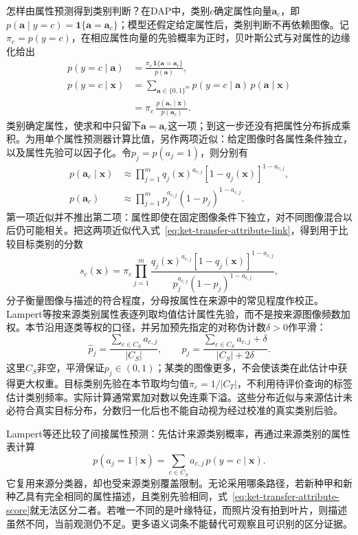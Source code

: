 怎样由属性预测得到类别判断？在DAP中，类别$c$确定属性向量$\bm a_c$，即$p(\bm a\mid y=c)=\mathbf 1\{\bm a=\bm a_c\}$；模型还假定给定属性后，类别判断不再依赖图像。记$\pi_c=p(y=c)$，在相应属性向量的先验概率为正时，贝叶斯公式与对属性的边缘化给出
\begin{equation}
  \begin{aligned}
    p(y=c\mid\bm a)
      &=\frac{\pi_c\,\mathbf 1\{\bm a=\bm a_c\}}{p(\bm a)},\\
    p(y=c\mid\bm x)
      &=\sum_{\bm a\in\{0,1\}^m}
          p(y=c\mid\bm a)\,p(\bm a\mid\bm x)\\
      &=\pi_c\,\frac{p(\bm a_c\mid\bm x)}{p(\bm a_c)}.
  \end{aligned}
  \label{eq:ket-transfer-attribute-link}
\end{equation}
类别确定属性，使求和中只留下$\bm a=\bm a_c$这一项；到这一步还没有把属性分布拆成乘积。为用单个属性预测器计算比值，另作两项近似：给定图像时各属性条件独立，以及属性先验可以因子化。令$p_j=p(a_j=1)$，则分别有
\[
  \begin{aligned}
    p(\bm a_c\mid\bm x)
      &\approx\prod_{j=1}^{m}
        q_j(\bm x)^{a_{c,j}}[1-q_j(\bm x)]^{1-a_{c,j}},\\
    p(\bm a_c)
      &\approx\prod_{j=1}^{m}
        p_j^{a_{c,j}}(1-p_j)^{1-a_{c,j}}.
  \end{aligned}
\]
第一项近似并不推出第二项：属性即使在固定图像条件下独立，对不同图像混合以后仍可能相关。把这两项近似代入式~\eqref{eq:ket-transfer-attribute-link}，得到用于比较目标类别的分数
\begin{equation}
  s_c(\bm x)=\pi_c
  \prod_{j=1}^{m}
  \frac{q_j(\bm x)^{a_{c,j}}
        [1-q_j(\bm x)]^{1-a_{c,j}}}
       {p_j^{a_{c,j}}(1-p_j)^{1-a_{c,j}}},
  \label{eq:ket-transfer-attribute-score}
\end{equation}
分子衡量图像与描述的符合程度，分母按属性在来源中的常见程度作校正。Lampert等按来源类别属性表逐列取均值估计属性先验，而不是按来源图像频数加权。本节沿用逐类等权的口径，并另加预先指定的对称伪计数$\delta>0$作平滑：
\[
  \hat p_j=\frac{\sum_{c\in C_S}a_{c,j}}{|C_S|},
  \qquad
  p_j=\frac{\sum_{c\in C_S}a_{c,j}+\delta}{|C_S|+2\delta}.
\]
这里$C_S$非空，平滑保证$p_j\in(0,1)$；某类的图像更多，不会使该类在此估计中获得更大权重。目标类别先验在本节取均匀值$\pi_c=1/|C_T|$，不利用待评价查询的标签估计类别频率。实际计算通常累加对数以免连乘下溢。这些分布近似与来源估计未必符合真实目标分布，分数归一化后也不能自动视为经过校准的真实类别后验。

Lampert等还比较了间接属性预测：先估计来源类别概率，再通过来源类别的属性表计算
\[
  p(a_j=1\mid\bm x)
  =\sum_{c\in C_S}a_{c,j}\,p(y=c\mid\bm x).
\]
它复用来源分类器，却也受来源类别覆盖限制。无论采用哪条路径，若新种甲和新种乙具有完全相同的属性描述，且类别先验相同，式~\eqref{eq:ket-transfer-attribute-score}就无法区分二者。若唯一不同的是叶缘特征，而照片没有拍到叶片，则描述虽然不同，当前观测仍不足。更多语义词条不能替代可观察且可识别的区分证据。

